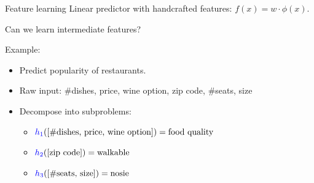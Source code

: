 \documentclass[usenames,dvipsnames,notes,11pt,aspectratio=169]{beamer}
\begin{document}
\begin{frame}
    {Feature learning}
    Linear predictor with handcrafted features: $f(x) = w\cdot\phi(x)$.

    Can we learn intermediate features?

    Example:\\
    \begin{itemize}
    \item Predict popularity of restaurants.
    \item Raw input: \#dishes, price, wine option, zip code, \#seats, size 
    \item Decompose into subproblems:
    \begin{itemize}
        \itemsep2ex
    \item[] ${\color{blue}h_1}(\left[ \text{\#dishes, price, wine option} \right]) = \text{food quality}$
    \item[] ${\color{blue}h_2}(\left[ \text{zip code} \right]) = \text{walkable}$
    \item[] ${\color{blue}h_3}(\left[ \text{\#seats, size} \right]) = \text{nosie}$
    \end{itemize}
    \end{itemize}

\end{frame}
\end{document}
